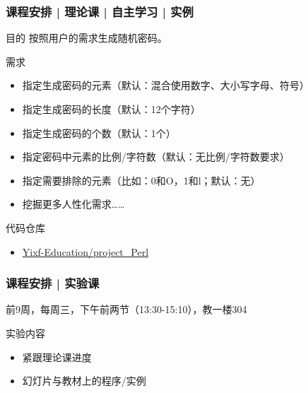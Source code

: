 \begin{frame}
  \frametitle{课程安排 | 理论课 | 自主学习 | 实例}
  \begin{block}{目的}
    按照用户的需求生成随机密码。
  \end{block}
  \pause
  \begin{block}{需求}
    \begin{itemize}
      \item 指定生成密码的元素（默认：混合使用数字、大小写字母、符号）
      \item 指定生成密码的长度（默认：12个字符）
      \item 指定生成密码的个数（默认：1个）
      \item 指定密码中元素的比例/字符数（默认：无比例/字符数要求）
      \item 指定需要排除的元素（比如：0和O，1和l；默认：无）
      \item 挖掘更多人性化需求……
    \end{itemize}
  \end{block}
  \pause
  \begin{block}{代码仓库}
    \begin{itemize}
      \item \href{https://github.com/Yixf-Education/project_Perl}{Yixf-Education/project\_Perl}
    \end{itemize}
  \end{block}
\end{frame}

\begin{frame}
  \frametitle{课程安排 | 实验课}
  \begin{center}
  \alert{前9周，每周三，下午前两节（13:30-15:10），教一楼304}\\
  \vspace{0.2cm}
  \end{center}
  \begin{block}{实验内容}
    \begin{itemize}
      \item 紧跟理论课进度
      \item 幻灯片与教材上的程序/实例
    \end{itemize}
  \end{block}
\end{frame}


